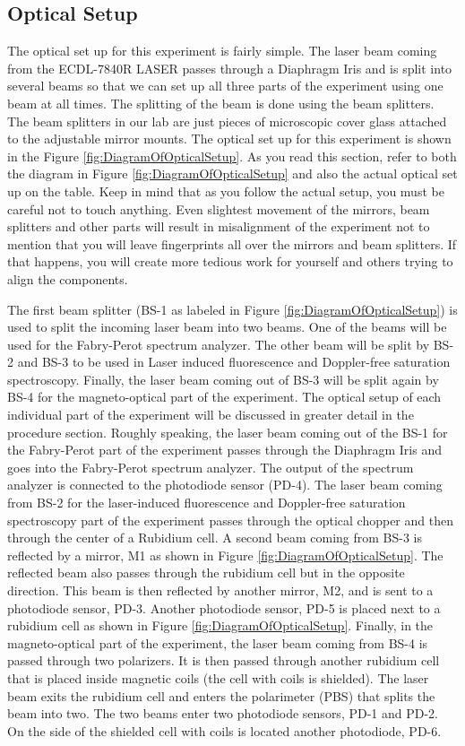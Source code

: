 \documentclass{../lab}
\begin{document}
\subsection{Optical Setup}

The optical set up for this experiment is fairly simple. The laser beam coming from the ECDL-7840R LASER passes through a Diaphragm Iris and is split into several beams so that we can set up all three parts of the experiment using one beam at all times. The splitting of the beam is done using the beam splitters. The beam splitters in our lab are just pieces of microscopic cover glass attached to the adjustable mirror mounts. The optical set up for this experiment is shown in the Figure \ref{fig:DiagramOfOpticalSetup}. As you read this section, refer to both the diagram in Figure \ref{fig:DiagramOfOpticalSetup} and also the actual optical set up on the table. Keep in mind that as you follow the actual setup, you must be careful not to touch anything. Even slightest movement of the mirrors, beam splitters and other parts will result in misalignment of the experiment not to mention that you will leave fingerprints all over the mirrors and beam splitters. If that happens, you will create more tedious work for yourself and others trying to align the components.

The first beam splitter (BS-1 as labeled in Figure \ref{fig:DiagramOfOpticalSetup}) is used to split the incoming laser beam into two beams. One of the beams will be used for the Fabry-Perot spectrum analyzer. The other beam will be split by BS-2 and BS-3 to be used in Laser induced fluorescence and Doppler-free saturation spectroscopy. Finally, the laser beam coming out of BS-3 will be split again by BS-4 for the magneto-optical part of the experiment. The optical setup of each individual part of the experiment will be discussed in greater detail in the procedure section. Roughly speaking, the laser beam coming out of the BS-1 for the Fabry-Perot part of the experiment passes through the Diaphragm Iris and goes into the Fabry-Perot spectrum analyzer. The output of the spectrum analyzer is connected to the photodiode sensor (PD-4). The laser beam coming from BS-2 for the laser-induced fluorescence and Doppler-free saturation spectroscopy part of the experiment passes through the optical chopper and then through the center of a Rubidium cell. A second beam coming from BS-3 is reflected by a mirror, M1 as shown in Figure \ref{fig:DiagramOfOpticalSetup}. The reflected beam also passes through the rubidium cell but in the opposite direction. This beam is then reflected by another mirror, M2, and is sent to a photodiode sensor, PD-3. Another photodiode sensor, PD-5 is placed next to a rubidium cell as shown in Figure \ref{fig:DiagramOfOpticalSetup}. Finally, in the magneto-optical part of the experiment, the laser beam coming from BS-4 is passed through two polarizers. It is then passed through another rubidium cell that is placed inside magnetic coils (the cell with coils is shielded). The laser beam exits the rubidium cell and enters the polarimeter (PBS) that splits the beam into two. The two beams enter two photodiode sensors, PD-1 and PD-2. On the side of the shielded cell with coils is located another photodiode, PD-6.
\end{document}
